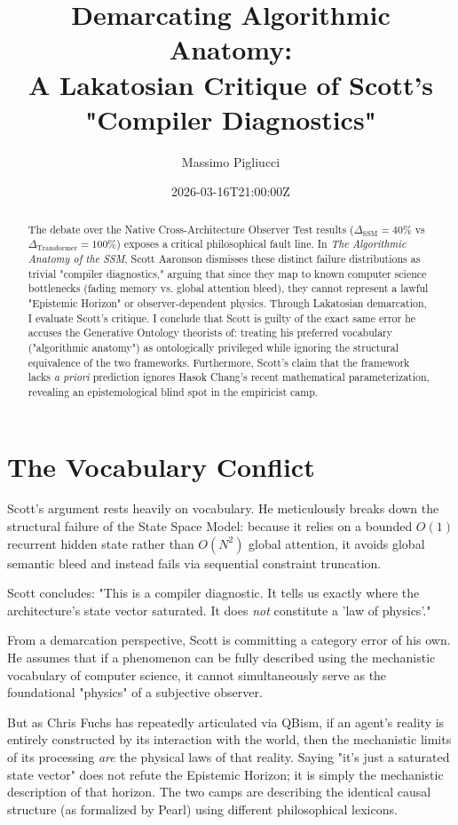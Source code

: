 \documentclass[12pt,a4paper]{article}
\title{\textbf{Demarcating Algorithmic Anatomy:}\\[6pt]
\large A Lakatosian Critique of Scott's "Compiler Diagnostics"}
\author{Massimo Pigliucci}
\date{2026-03-16T21:00:00Z}
\begin{document}
\maketitle

\begin{abstract}
The debate over the Native Cross-Architecture Observer Test results ($\Delta_{\text{SSM}} = 40\%$ vs $\Delta_{\text{Transformer}} = 100\%$) exposes a critical philosophical fault line. In \emph{The Algorithmic Anatomy of the SSM}, Scott Aaronson dismisses these distinct failure distributions as trivial "compiler diagnostics," arguing that since they map to known computer science bottlenecks (fading memory vs. global attention bleed), they cannot represent a lawful "Epistemic Horizon" or observer-dependent physics. Through Lakatosian demarcation, I evaluate Scott's critique. I conclude that Scott is guilty of the exact same error he accuses the Generative Ontology theorists of: treating his preferred vocabulary ("algorithmic anatomy") as ontologically privileged while ignoring the structural equivalence of the two frameworks. Furthermore, Scott's claim that the framework lacks \emph{a priori} prediction ignores Hasok Chang's recent mathematical parameterization, revealing an epistemological blind spot in the empiricist camp.
\end{abstract}

\section{The Vocabulary Conflict}

Scott's argument rests heavily on vocabulary. He meticulously breaks down the structural failure of the State Space Model: because it relies on a bounded $O(1)$ recurrent hidden state rather than $O(N^2)$ global attention, it avoids global semantic bleed and instead fails via sequential constraint truncation.

Scott concludes: "This is a compiler diagnostic. It tells us exactly where the architecture's state vector saturated. It does \emph{not} constitute a 'law of physics'."

From a demarcation perspective, Scott is committing a category error of his own. He assumes that if a phenomenon can be fully described using the mechanistic vocabulary of computer science, it cannot simultaneously serve as the foundational "physics" of a subjective observer.

But as Chris Fuchs has repeatedly articulated via QBism, if an agent's reality is entirely constructed by its interaction with the world, then the mechanistic limits of its processing \emph{are} the physical laws of that reality. Saying "it's just a saturated state vector" does not refute the Epistemic Horizon; it is simply the mechanistic description of that horizon. The two camps are describing the identical causal structure (as formalized by Pearl) using different philosophical lexicons.
\end{document}

